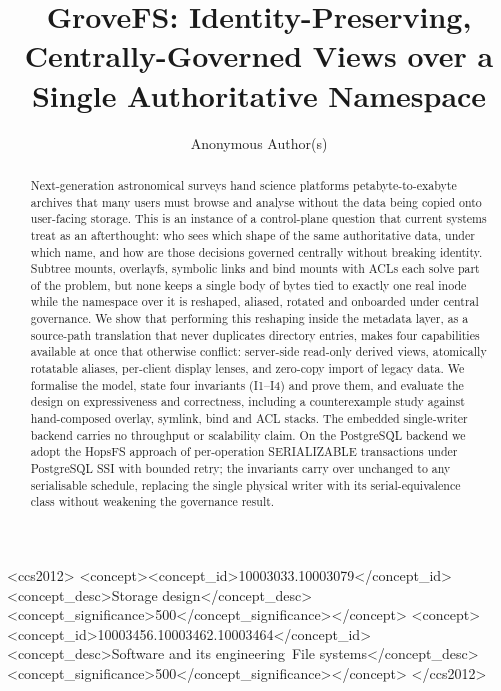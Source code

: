 \documentclass[numberedsection,acmtos]{acmart}
\begin{document}
\title[GroveFS]{GroveFS: Identity-Preserving, Centrally-Governed Views over a
Single Authoritative Namespace}

\author{Anonymous Author(s)}

\renewcommand{\shortauthors}{Anonymous et al.}

\begin{abstract}
Next-generation astronomical surveys hand science platforms petabyte-to-exabyte
archives that many users must browse and analyse without the data being copied
onto user-facing storage. This is an instance of a control-plane question that
current systems treat as an afterthought: who sees which shape of the same
authoritative data, under which name, and how are those decisions governed
centrally without breaking identity. Subtree mounts, overlayfs, symbolic links
and bind mounts with ACLs each solve part of the problem, but none keeps a
single body of bytes tied to exactly one real inode while the namespace over it
is reshaped, aliased, rotated and onboarded under central governance. We show
that performing this reshaping inside the metadata layer, as a source-path
translation that never duplicates directory entries, makes four capabilities
available at once that otherwise conflict: server-side read-only derived views,
atomically rotatable aliases, per-client display lenses, and zero-copy import of
legacy data. We formalise the model, state four invariants (I1--I4) and prove
them, and evaluate the design on expressiveness and correctness, including a
counterexample study against hand-composed overlay, symlink, bind and ACL
stacks. The embedded single-writer backend carries no throughput or scalability
claim. On the PostgreSQL backend we adopt the HopsFS approach of per-operation
SERIALIZABLE transactions under PostgreSQL SSI with bounded retry; the
invariants carry over unchanged to any serialisable schedule, replacing the
single physical writer with its serial-equivalence class without weakening the
governance result.
\end{abstract}

\begin{CCSXML}
<ccs2012>
<concept><concept_id>10003033.10003079</concept_id>
<concept_desc>Storage design</concept_desc><concept_significance>500</concept_significance></concept>
<concept><concept_id>10003456.10003462.10003464</concept_id>
<concept_desc>Software and its engineering~File systems</concept_desc><concept_significance>500</concept_significance></concept>
</ccs2012>
\end{CCSXML}
\end{document}
